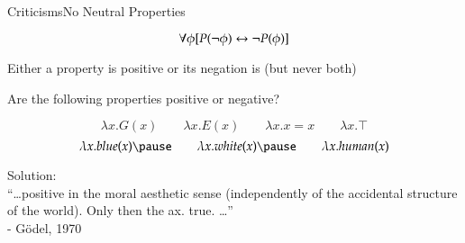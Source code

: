 \begin{frame}{Criticisms}{No Neutral Properties} \centering

$$\forall \phi [P(\neg \phi) \leftrightarrow \neg P(\phi)]$$

Either a property is positive or its negation is (but never both)
		  
\pause
\bigskip

Are the following properties positive or negative?

$$
\lambda x. G(x) \qquad \lambda x. E(x) \qquad \lambda x. x = x  \qquad  \lambda x. \top
$$
\pause
$$
\lambda x. blue(x) \pause \qquad \lambda x. white(x) \pause \qquad \lambda x. human(x)
$$



\pause
\bigskip

Solution: \\
``\ldots positive in the moral aesthetic sense (independently of the accidental structure of the world). Only then the ax. true. \ldots''
\\ \hfill - G\"odel, 1970
\end{frame}


